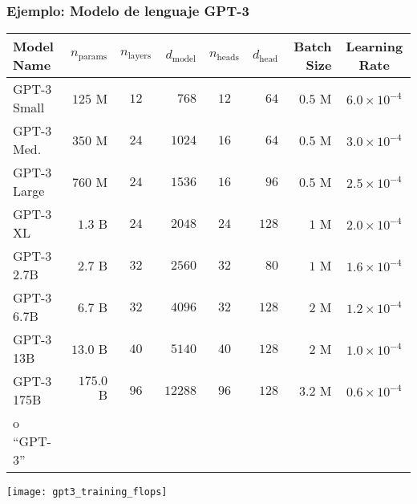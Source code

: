 \documentclass[table]{beamer}
\begin{document}
\begin{frame}
    \frametitle{Ejemplo: Modelo de lenguaje GPT-3}
    \begin{center}
        \scriptsize
        \begin{tabular}{lrcrcrrc}
        Model Name & $n_{\text{params}}$ & $n_{\text{layers}}$ & $d_{\text{model}}$ & $n_{\text{heads}}$ & $d_{\text{head}}$  & Batch Size & Learning Rate \\
        \hline
GPT-3 Small & $125$ M & $12$ & $768$ & $12$ & $64$ & $0.5$ M & $6.0 \times 10^{-4}$ \\
GPT-3 Med. & $350$ M & $24$ & $1024$ & $16$ & $64$ & $0.5$ M & $3.0 \times 10^{-4}$ \\
GPT-3 Large & $760$ M & $24$ & $1536$ & $16$ & $96$ & $0.5$ M & $2.5 \times 10^{-4}$ \\
GPT-3 XL & $1.3$ B & $24$ & $2048$ & $24$ & $128$ & $1$ M & $2.0 \times 10^{-4}$ \\
GPT-3 2.7B   & $2.7$ B & $32$ & $2560$ & $32$ & $80$ & $1$ M & $1.6 \times 10^{-4}$ \\
GPT-3 6.7B   & $6.7$ B & $32$ & $4096$ & $32$ & $128$ & $2$ M & $1.2 \times 10^{-4}$ \\
GPT-3 13B  & $13.0$ B & $40$ & $5140$ & $40$ & $128$ & $2$ M & $1.0 \times 10^{-4}$ \\
GPT-3 175B & $175.0$ B & $96$ & $12288$ & $96$ & $128$ & $3.2$ M & $0.6 \times 10^{-4}$ \\
o ``GPT-3'' & & & & & & &
        \end{tabular}
        \texttt{[image: gpt3\_training\_flops]}
    \end{center}
\end{frame}
\end{document}
